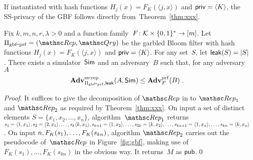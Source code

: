 If instantiated with hash functions $H_j(x) = F_K(\langle j,x \rangle)$ and ${\sf priv} = \langle K \rangle$, the SS-privacy of the GBF follows directly from~Theorem~\ref{thm:xxx}.
\begin{theorem}
\label{thm:gbf-prf-privacy}
Fix $k,m,n,r,\lambda>0$ and a function family~$F\colon {\cal K} \times \{0,1\}^* \to [m]$.  Let $\setprim_{\mathrm{gbf\mbox{-}prf}}= (\Rep, \Qry)$ be the garbled Bloom filter with hash functions $H_j(x)=F_K(\langle j,x \rangle)$ and ${\sf priv}=\langle K \rangle$.  For any set~$S$, let ${\sf leak}(S)=|S|$.  There exists a simulator~${\sf Sim}$ and an adversary~$B$ such that, for any adversary~$A$
\[
\mathrm{\mathbf{Adv}}^{\mathrm{ss\mbox{-}rep}}_{\Pi_{\mathrm{gbf\mbox{-}prf}},{\sf leak}}(A,{\sf Sim}) \leq  \mathbf{Adv}^{\mathrm{prf}}_{F}(B)\;.
\]
\end{theorem}
\begin{proof}
It suffices to give the decomposition of $\Rep$ in to $\Rep_1$ and $\Rep_2$ as required by Theorem~\ref{thm:xxx}.
On input a set of distinct elements $S=\{x_1,x_2,\ldots,x_n\}$, algorithm~$\Rep_1$ returns $s_1=\langle 1,x_1 \rangle, s_2=\langle 2,x_1 \rangle, \ldots, s_k\langle k,x_1\rangle, s_{k+1}=\langle 1,x_2\rangle, \ldots,\linebreak s_{2k}=\langle k,x_2\rangle, \ldots ,s_{kn+1}=\langle 1,x_n\rangle, \ldots, s_{kn}=\langle k,x_n \rangle$.  On input $n,F_K(s_1),\ldots,\linebreak F_K(s_{kn})$, algorithm $\Rep_2$ carries out the pseudocode of~$\Rep$ in Figure~\ref{fig:gbf}, making use of $F_K(s_1),\ldots,F_K(s_{kn})$ in the obvious way.  It returns~$M$ as ${\sf pub}$.\hfill\qed
\end{proof}


